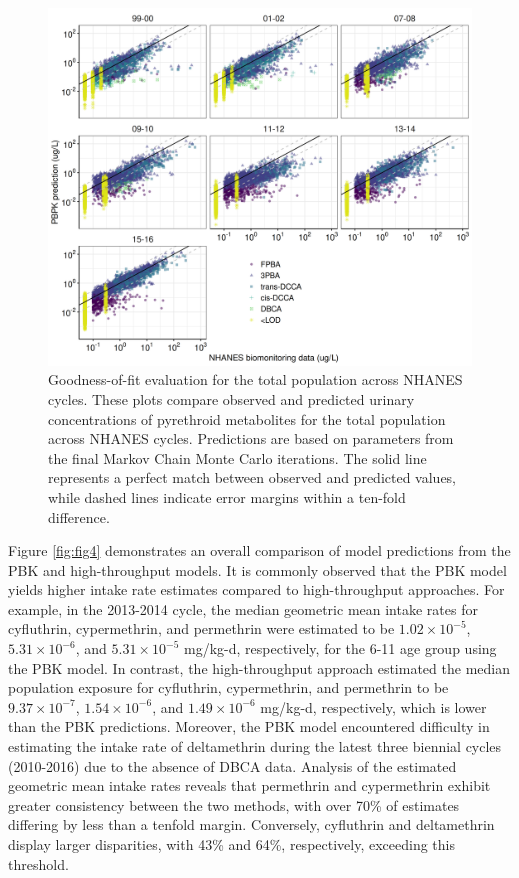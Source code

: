 \documentclass[toxics,article,submit,pdftex,moreauthors]{Definitions/mdpi}
\begin{document}
\begin{figure}[H]
\centering
\begin{adjustwidth}{-2cm}{}
\centering
\includegraphics[width=\linewidth]{figures/fig3}
\hfill
\end{adjustwidth}
\caption{Goodness-of-fit evaluation for the total population across NHANES
cycles. These plots compare observed and predicted urinary concentrations of
pyrethroid metabolites for the total population across NHANES cycles.
Predictions are based on parameters from the final Markov Chain Monte Carlo
iterations. The solid line represents a perfect match between observed and
predicted values, while dashed lines indicate error margins within a ten-fold
difference.\label{fig:fig3}}
\end{figure}

Figure \ref{fig:fig4} demonstrates an overall comparison of model
predictions from the PBK and high-throughput models. It is commonly
observed that the PBK model yields higher intake rate estimates compared
to high-throughput approaches. For example, in the 2013-2014 cycle, the
median geometric mean intake rates for cyfluthrin, cypermethrin, and
permethrin were estimated to be \(1.02 \times
10^{-5}\), \(5.31 \times 10^{-6}\), and \(5.31 \times 10^{-5}\) mg/kg-d,
respectively, for the 6-11 age group using the PBK model. In contrast,
the high-throughput approach estimated the median population exposure
for cyfluthrin, cypermethrin, and permethrin to be
\(9.37 \times 10^{-7}\), \(1.54
\times 10^{-6}\), and \(1.49 \times 10^{-6}\) mg/kg-d, respectively,
which is lower than the PBK predictions. Moreover, the PBK model
encountered difficulty in estimating the intake rate of deltamethrin
during the latest three biennial cycles (2010-2016) due to the absence
of DBCA data. Analysis of the estimated geometric mean intake rates
reveals that permethrin and cypermethrin exhibit greater consistency
between the two methods, with over 70\% of estimates differing by less
than a tenfold margin. Conversely, cyfluthrin and deltamethrin display
larger disparities, with 43\% and 64\%, respectively, exceeding this
threshold.
\end{document}
